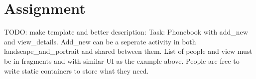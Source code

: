 \section{Assignment}
TODO: make template and better description:
Task: Phonebook with add_new and view_details. Add_new can be a seperate activity in both landscape_and_portrait and shared between them. List of people and view must be in fragments and with similar UI as the example above. People are free to write static containers to store what they need.
